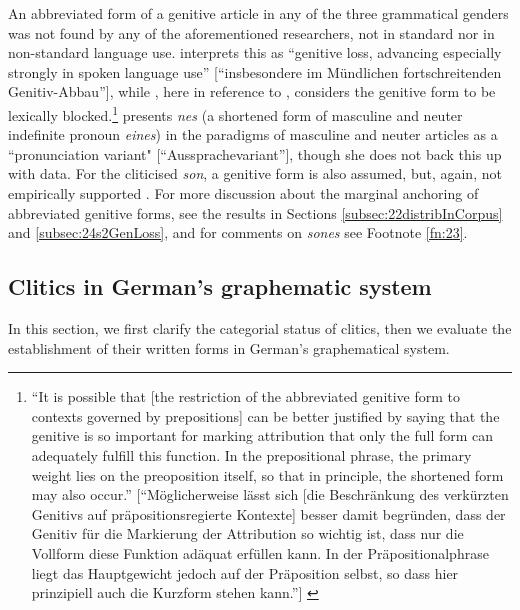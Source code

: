 An abbreviated form of a genitive article in any of the three grammatical genders was not found by any of the aforementioned researchers, not in standard nor in non-standard language use. 
\citet[5]{Burri2003} interprets this as ``genitive loss, advancing especially strongly in spoken language use'' [``insbesondere im Mündlichen fortschreitenden Genitiv-Abbau''], while \citet[178]{Vogel2006}, here in reference to \citet[112]{Prinz1991}, considers the genitive form to be lexically blocked.\footnote{
	``It is possible that [the restriction of the abbreviated genitive form to contexts governed by prepositions] can be better justified by saying that the genitive is so important for marking attribution that only the full form can adequately fulfill this function.
	In the prepositional phrase, the primary weight lies on the preoposition itself, so that in principle, the shortened form may also occur.'' [``Möglicherweise lässt sich [die Beschränkung des verkürzten Genitivs auf präpositionsregierte Kontexte] besser damit begründen, dass der Genitiv für die Markierung der Attribution so wichtig ist, dass nur die Vollform diese Funktion adäquat erfüllen kann. In der Präpositionalphrase liegt das Hauptgewicht jedoch auf der Präposition selbst, so dass hier prinzipiell auch die Kurzform stehen kann.''] \citep[178]{Vogel2006}}
\citet[76]{Ziegler2011} presents \textit{nes} (a shortened form of masculine and neuter indefinite pronoun \textit{eines}) in the paradigms of masculine and neuter articles as a ``pronunciation variant" [``Aussprachevariant''], though she does not back this up with data.
For the cliticised \textit{son}, a genitive form is also assumed, but, again, not empirically supported \citep[30]{Heusinger2012}.
For more discussion about the marginal anchoring of abbreviated genitive forms, see the results in Sections \ref{subsec:22distribInCorpus} and \ref{subsec:24s2GenLoss}, and for comments on \textit{sones} see Footnote \ref{fn:23}.

\subsection{Clitics in German's graphematic system}
\label{subsec:13cliticsGraphematics}

In this section, we first clarify the categorial status of clitics, then we evaluate the establishment of their written forms in German's graphematical system.

